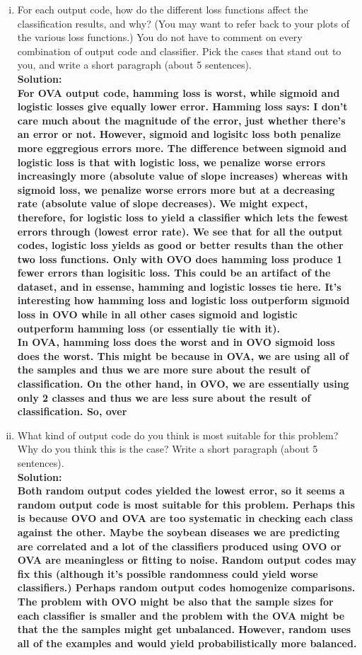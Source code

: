 \documentclass[11pt]{article}
\begin{document}
\begin{enumerate}[(a)]
\begin{enumerate}[i.]
	\item For each output code, how do the different loss functions affect the classification results, and why? (You may want to refer back to your plots of the various loss functions.) You do not have to comment on every combination of output code and classifier. Pick the cases that stand out to you, and write a short paragraph (about 5 sentences). \\
	\textbf{Solution: \\
	For OVA output code, hamming loss is worst, while sigmoid and logistic losses give equally lower error. Hamming loss says: I don't care much about the magnitude of the error, just whether there's an error or not. However, sigmoid and logisitc loss both penalize more eggregious errors more. The difference between sigmoid and logistic loss is that with logistic loss, we penalize worse errors increasingly more (absolute value of slope increases) whereas with sigmoid loss, we penalize worse errors more but at a decreasing rate (absolute value of slope decreases). We might expect, therefore, for logistic loss to yield a classifier which lets the fewest errors through (lowest error rate). We see that for all the output codes, logistic loss yields as good or better results than the other two loss functions. Only with OVO does hamming loss produce 1 fewer errors than logisitic loss. This could be an artifact of the dataset, and in essense, hamming and logistic losses tie here. It's interesting how hamming loss and logistic loss outperform sigmoid loss in OVO while in all other cases sigmoid and logistic outperform hamming loss (or essentially tie with it). \\
	In OVA, hamming loss does the worst and in OVO sigmoid loss does the worst. This might be because in OVA, we are using all of the samples and thus we are more sure about the result of classification. On the other hand, in OVO, we are essentially using only 2 classes and thus we are less sure about the result of classification. So, over 
	}

	\item What kind of output code do you think is most suitable for this problem? Why do you think this is the case? Write a short paragraph (about 5 sentences). \\
	\textbf{Solution: \\
	Both random output codes yielded the lowest error, so it seems a random output code is most suitable for this problem. Perhaps this is because OVO and OVA are too systematic in checking each class against the other. Maybe the soybean diseases we are predicting are correlated and a lot of the classifiers produced using OVO or OVA are meaningless or fitting to noise. Random output codes may fix this (although it's possible randomness could yield worse classifiers.) Perhaps random output codes homogenize comparisons.\\
	The problem with OVO might be also that the sample sizes for each classifier is smaller and the problem with the OVA might be that the the samples might get unbalanced. However, random uses all of the examples and would yield probabilistically more balanced. 
	 }


\end{enumerate}
\end{enumerate}
\end{document}
